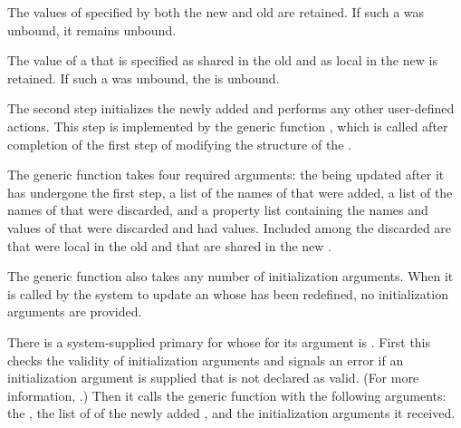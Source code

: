 The values of  specified by both the new and old
 are retained. If such a  was unbound,
it remains unbound.

The value of a  that is specified as shared in the old 
 and as local in the new  is retained.  If such 
a  was unbound, the  is unbound.

\endsubsubsection%



The second step initializes the newly added  and performs
any other user-defined actions.  This step is implemented by the generic
function , which is called after
completion of the first step of modifying the structure of the
.

The generic function  takes
four required arguments: the  being updated after it has
undergone the first step, a list of the names of  that were
added, a list of the names of  that were discarded, and a
property list containing the  names and values of 
 that were
discarded and had values.  Included among the discarded  are
 that were local in the old  and that are shared in the new
.
                      
The generic function  also
takes any number of initialization arguments.  When it is called by
the system to update an  whose  
has been redefined, no
initialization arguments are provided.
                                               
There is a system-supplied primary  for 
 whose 
for its  argument is .  
First this  checks the validity of initialization arguments and signals an
error if an initialization argument is supplied that is not declared
as valid.  (For more information, \seesection\DeclaringInitargValidity.)
Then it calls the generic function
 with the following arguments: the 
,
the list of  of 
the newly added , and the initialization
arguments it received.

